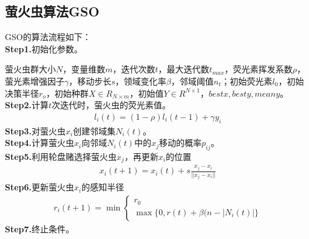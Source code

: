     \subsection{萤火虫算法GSO}
        \par
        GSO的算法流程如下：\\
        \textbf{Step1.}初始化参数。
        \par
        萤火虫群大小$N$，变量维数$m$，迭代次数$t$，最大迭代数$t_{max}$，荧光素挥发系数$\rho$，萤光素增强因子$\gamma$，移动步长$s$，领域变化率$\beta$，邻域阈值$n_t$；初始荧光素$l_0$，初始决策半径$r_o$，初始种群$X\in R_{N\times m}$，初始值$Y\in R^{N\times 1}$，$bestx,besty,meany$。\\
        \textbf{Step2.}计算$t$次迭代时，萤火虫的荧光素值。
        \begin{align*}
        l_i(t) = (1-\rho)l_i(t-1)+\gamma y_i
        \end{align*}
        \textbf{Step3.}对萤火虫$x_i$创建邻域集$N_i(t)$。\\
        \textbf{Step4.}计算萤火虫$x_i$向邻域$N_i(t)$中的$x_j$移动的概率$p_{ij}$。\\
        \textbf{Step5.}利用轮盘赌选择萤火虫$x_j$，再更新$x_i$的位置
        \begin{align*}
        x_i(t+1) = x_i(t) + s\frac{x_j-x_i}{||x_j-x_i||}
        \end{align*}
        \textbf{Step6.}更新萤火虫$x_i$的感知半径
        \begin{align*}
        r_i(t+1) = \min\left\{
        \begin{aligned}
        r_0\\
        \max\{0,r(t)+\beta(n-|N_i(t)|  \}
        \end{aligned}
        \right.
        \end{align*}
        \textbf{Step7.}终止条件。

